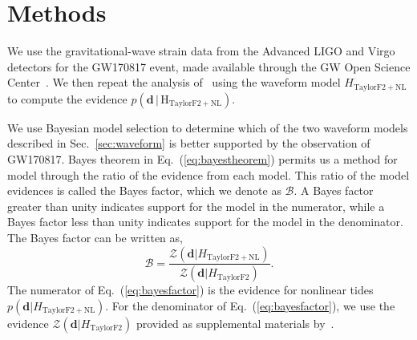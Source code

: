 \section{Methods} \label{sec:methods}
We use the gravitational-wave strain data from the Advanced LIGO and Virgo detectors for the GW170817 event, made available through the GW Open Science Center~\citep{Vallisneri:2014vxa,gw170817-losc}. We then repeat the analysis of~\cite{de2018tidal} using the waveform model $H_\mathrm{TaylorF2+NL}$ to compute the evidence $p(\mathbf{d}\, | \, \mathrm{H}_\mathrm{TaylorF2+NL})$.

We use Bayesian model selection to determine which of the two waveform models described in Sec.~\ref{sec:waveform} is better supported by the observation of GW170817. Bayes theorem in Eq.~(\ref{eq:bayestheorem}) permits us a method for model  through the ratio of the evidence from each model. This ratio of the model evidences is called the Bayes factor, which we denote as $\mathcal{B}$. A Bayes factor greater than unity indicates support for the model in the numerator, while a Bayes factor less than unity indicates support for the model in the denominator. The Bayes factor can be written as,
\begin{equation}
\mathcal{B} = \frac{\mathcal{Z}\left(\mathbf{d}|H_\mathrm{TaylorF2+NL}\right)}{\mathcal{Z}\left(\mathbf{d}|H_\mathrm{TaylorF2}\right)}.
\label{eq:bayesfactor}
\end{equation}
The numerator of Eq.~(\ref{eq:bayesfactor}) is the evidence for nonlinear tides $p\left(\mathbf{d}|H_\mathrm{TaylorF2+NL}\right)$. For the denominator of Eq.~(\ref{eq:bayesfactor}), we use the evidence $\mathcal{Z}(\mathbf{d}|H_\mathrm{TaylorF2})$ provided as supplemental materials by~\citep{de2018tidal}.

